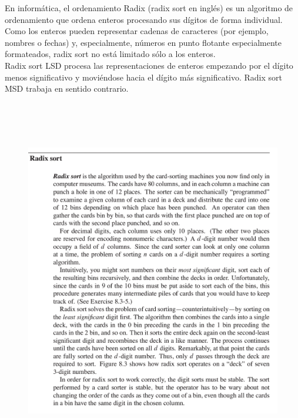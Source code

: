 \documentclass[a4paper]{article} %
\begin{document}
		En informática, el ordenamiento Radix (radix sort en inglés) es un algoritmo de ordenamiento que ordena enteros procesando sus dígitos de forma individual. Como los enteros pueden representar cadenas de caracteres (por ejemplo, nombres o fechas) y, especialmente, números en punto flotante especialmente formateados, radix sort no está limitado sólo a los enteros.\\
		Radix sort LSD procesa las representaciones de enteros empezando por el dígito menos significativo y moviéndose hacia el dígito más significativo. Radix sort MSD trabaja en sentido contrario.\\
		\begin{figure}[ht]
			\begin{center}
				\includegraphics[width=\textwidth,height=160mm]{Imagenes/radixsort/radix01.png}				
			\end{center} 
		\end{figure}
		\afterpage{\newpage}
		\newpage
\end{document}
